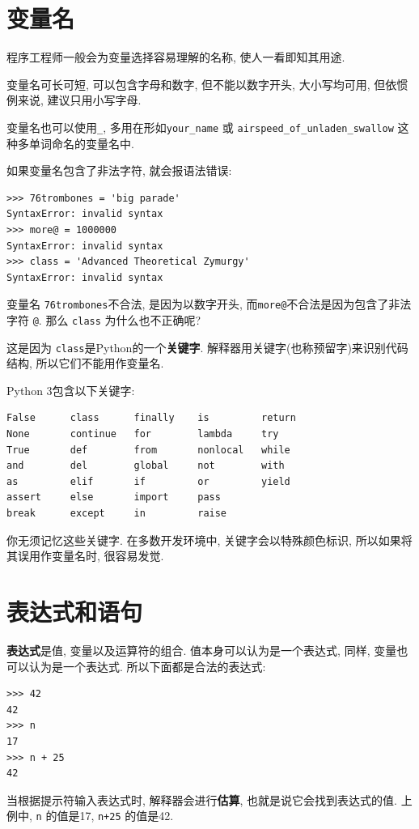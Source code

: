 \documentclass[10pt]{book}
\begin{document}
\section{变量名}

程序工程师一般会为变量选择容易理解的名称, 使人一看即知其用途. 

变量名可长可短, 可以包含字母和数字, 但不能以数字开头, 
大小写均可用, 但依惯例来说, 建议只用小写字母. 

变量名也可以使用\verb"_",  多用在形如\verb"your_name" 或 
\verb"airspeed_of_unladen_swallow" 这种多单词命名的变量名中. 

如果变量名包含了非法字符, 就会报语法错误:

\begin{verbatim}
>>> 76trombones = 'big parade'
SyntaxError: invalid syntax
>>> more@ = 1000000
SyntaxError: invalid syntax
>>> class = 'Advanced Theoretical Zymurgy'
SyntaxError: invalid syntax
\end{verbatim}
%
变量名 {\tt 76trombones}不合法, 是因为以数字开头, 
而{\tt more@}不合法是因为包含了非法字符 {\tt @}. 
那么 {\tt class} 为什么也不正确呢?

这是因为 {\tt class}是Python的一个{\bf 关键字}. 
解释器用关键字(也称预留字)来识别代码结构, 所以它们不能用作变量名. 

Python 3包含以下关键字:

\begin{verbatim}
False      class      finally    is         return
None       continue   for        lambda     try
True       def        from       nonlocal   while
and        del        global     not        with
as         elif       if         or         yield
assert     else       import     pass
break      except     in         raise
\end{verbatim}
%

你无须记忆这些关键字. 在多数开发环境中, 关键字会以特殊颜色标识, 
所以如果将其误用作变量名时, 很容易发觉. 

\section{表达式和语句}

{\bf 表达式}是值, 变量以及运算符的组合. 
值本身可以认为是一个表达式, 同样, 变量也可以认为是一个表达式. 
所以下面都是合法的表达式:

\begin{verbatim}
>>> 42
42
>>> n
17
>>> n + 25
42
\end{verbatim}
%
当根据提示符输入表达式时, 解释器会进行{\bf 估算}, 也就是说它会找到表达式的值. 
上例中, {\tt n} 的值是17, {\tt n+25} 的值是42. 
\end{document}
